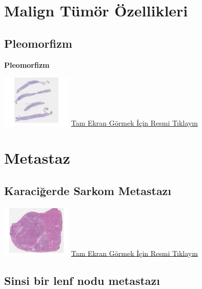 \documentclass[
  letterpaper,
  DIV=11,
  numbers=noendperiod]{scrreprt}
\begin{document}
\hypertarget{sec-malign-tumor-ozellikleri}{%
\chapter{Malign Tümör Özellikleri}\label{sec-malign-tumor-ozellikleri}}

\hypertarget{sec-pleomorfizm}{%
\section{Pleomorfizm}\label{sec-pleomorfizm}}

\textbf{Pleomorfizm}

\href{https://images.patolojiatlasi.com/pleomorphism/HE.html}{\includegraphics[width=0.25\textwidth,height=\textheight]{./screenshots/pleomorphism_screenshot.png}}
\href{https://images.patolojiatlasi.com/pleomorphism/HE.html}{Tam Ekran
Görmek İçin Resmi Tıklayın}

\hypertarget{sec-metastaz}{%
\chapter{Metastaz}\label{sec-metastaz}}

\hypertarget{sec-karaciger-sarkom-metastaz}{%
\section{Karaciğerde Sarkom
Metastazı}\label{sec-karaciger-sarkom-metastaz}}

\href{https://images.patolojiatlasi.com/metastaticsarcoma/HE.html}{\includegraphics[width=0.25\textwidth,height=\textheight]{./screenshots/metastaticsarcoma_screenshot.png}}
\href{https://images.patolojiatlasi.com/metastaticsarcoma/HE.html}{Tam
Ekran Görmek İçin Resmi Tıklayın}

\hypertarget{sec-sinsi-lenf-nodu-metastazi}{%
\section{Sinsi bir lenf nodu
metastazı}\label{sec-sinsi-lenf-nodu-metastazi}}
\end{document}
